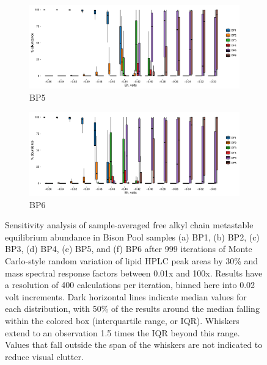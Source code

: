 {\begin{figure}[h]
    \begin{subfigure}[b]{\linewidth}
    	\includegraphics[width=\linewidth]{"figs_ch2/boxplot_ggplot_02bin Bison OF5 iter 999"}
    	\caption{BP5}
        \label{fig:BP5_mc}
    \end{subfigure}
    \begin{subfigure}[b]{\linewidth}
    	\includegraphics[width=\linewidth]{"figs_ch2/boxplot_ggplot_02bin Bison OF6 iter 999"}
    	\caption{BP6}
        \label{fig:BP6_mc}
    \end{subfigure}
    
    \caption[Sensitivity analysis sample-averaged free alkyl chain metastable equilibrium percent abundance in Bison Pool samples]{Sensitivity analysis of sample-averaged free alkyl chain metastable equilibrium abundance in Bison Pool samples (a) BP1, (b) BP2, (c) BP3, (d) BP4, (e) BP5, and (f) BP6 after 999 iterations of Monte Carlo-style random variation of lipid HPLC peak areas by 30\% and mass spectral response factors between 0.01x and 100x. Results have a resolution of 400 calculations per iteration, binned here into 0.02 volt increments. Dark horizontal lines indicate median values for each distribution, with 50\% of the results around the median falling within the colored box (interquartile range, or IQR). Whiskers extend to an observation 1.5 times the IQR beyond this range. Values that fall outside the span of the whiskers are not indicated to reduce visual clutter.}
    \label{fig:bison_mc}
\end{figure}
\doublespace
\clearpage
}

